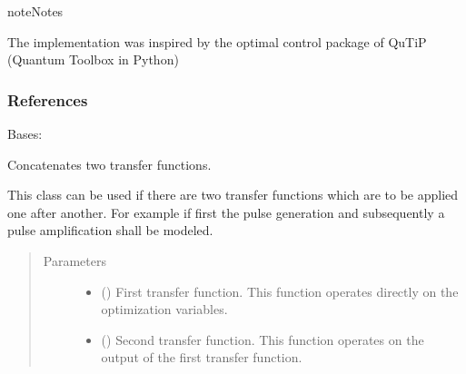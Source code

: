 \documentclass[letterpaper,10pt,english]{sphinxmanual}
\begin{document}
\begin{sphinxadmonition}{note}{Notes}

The implementation was inspired by the optimal control package of QuTiP 
(Quantum Toolbox in Python)
\end{sphinxadmonition}
\subsubsection*{References}

\begin{fulllineitems}
\label{\detokenize{qsim:qsim.transfer_function.ConcatenateTF}}
Bases: {\hyperref[\detokenize{qsim:qsim.transfer_function.TransferFunction}]{}}

Concatenates two transfer functions.

This class can be used if there are two transfer functions which are to be
applied one after another. For example if first the pulse generation and
subsequently a pulse amplification shall be modeled.
\begin{quote}\begin{description}
\item[{Parameters}] \leavevmode\begin{itemize}
\item {} 
 ({\hyperref[\detokenize{qsim:qsim.transfer_function.TransferFunction}]{}}) \textendash{} First transfer function. This function operates directly on the
optimization variables.

\item {} 
 ({\hyperref[\detokenize{qsim:qsim.transfer_function.TransferFunction}]{}}) \textendash{} Second transfer function. This function operates on the
output of the first transfer function.


\end{itemize}
\end{description}
\end{quote}
\end{fulllineitems}
\end{document}
